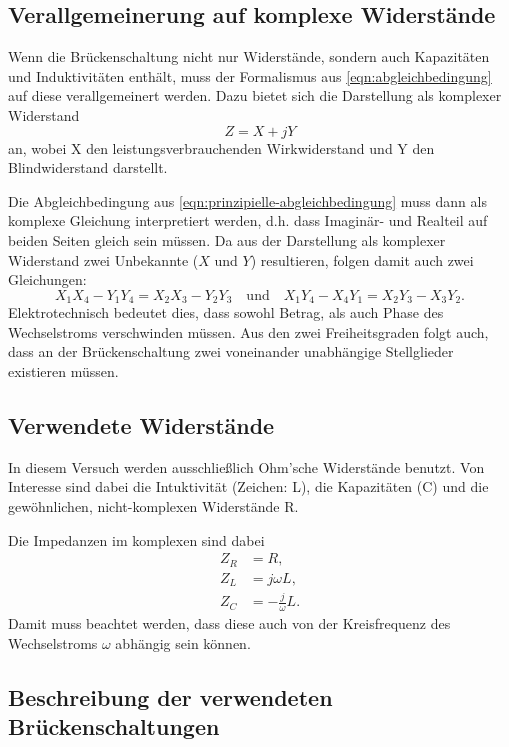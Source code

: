\subsection{Verallgemeinerung auf komplexe Widerstände}
\label{sec:komplexe-widerstände}
Wenn die Brückenschaltung nicht nur Widerstände, sondern auch Kapazitäten und Induktivitäten
enthält, muss der Formalismus aus \autoref{eqn:abgleichbedingung} auf diese verallgemeinert
werden. Dazu bietet sich die Darstellung als komplexer Widerstand
\begin{equation}
	Z = X + jY
	\label{eqn:komplexer-widerstand}
\end{equation}
an, wobei X den leistungsverbrauchenden Wirkwiderstand und Y den Blindwiderstand darstellt.

Die Abgleichbedingung aus \autoref{eqn:prinzipielle-abgleichbedingung} muss dann als komplexe
Gleichung interpretiert werden, d.h. dass Imaginär- und Realteil auf beiden Seiten gleich sein
müssen. Da aus der Darstellung als komplexer Widerstand zwei Unbekannte ($X$ und $Y$) resultieren,
folgen damit auch zwei Gleichungen:
\begin{equation}
	X_1X_4 - Y_1Y_4 = X_2X_3 - Y_2Y_3 
	\quad \text{und} \quad
	X_1Y_4 - X_4Y_1 = X_2Y_3 - X_3Y_2.
	\label{eqn:komplexe-abgleichbedingung}
\end{equation}
Elektrotechnisch bedeutet dies, dass sowohl Betrag, als auch Phase des Wechselstroms verschwinden
müssen. Aus den zwei Freiheitsgraden folgt auch, dass an der Brückenschaltung zwei voneinander
unabhängige Stellglieder existieren müssen.

\subsection{Verwendete Widerstände}
\label{seq:widerstände}
In diesem Versuch werden ausschließlich Ohm'sche Widerstände benutzt. Von Interesse sind dabei
die Intuktivität (Zeichen: L), die Kapazitäten (C) und die gewöhnlichen, nicht-komplexen 
Widerstände R.

Die Impedanzen im komplexen sind dabei
\begin{align}
	Z_R &= R, \\
	Z_L &= j\omega L, \\
	Z_C &= -\frac{j}{\omega} L.
	\label{eqn:impedanzen}
\end{align}
Damit muss beachtet werden, dass diese auch von der Kreisfrequenz des Wechselstroms $\omega$ 
abhängig sein können. 

\subsection{Beschreibung der verwendeten Brückenschaltungen}
\label{sec:spezielle-Schaltungen}

